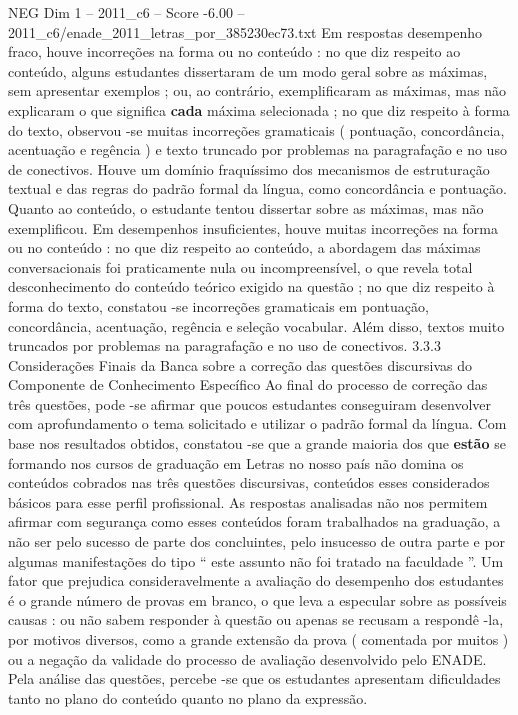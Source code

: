 \begin{textsample}{NEG Dim 1 – 2011\_c6 – Score -6.00 – 2011\_c6/enade\_2011\_letras\_por\_385230ec73.txt}
Em respostas desempenho fraco, houve incorreções na forma ou no conteúdo : no que diz respeito ao conteúdo, alguns estudantes dissertaram de um modo geral sobre as máximas, sem apresentar exemplos ; ou, ao contrário, exemplificaram as máximas, mas não explicaram o que significa \textbf{cada} máxima selecionada ; no que diz respeito à forma do texto, observou -se muitas incorreções gramaticais ( pontuação, concordância, acentuação e regência ) e texto truncado por problemas na paragrafação e no uso de conectivos.
Houve um domínio fraquíssimo dos mecanismos de estruturação textual e das regras do padrão formal da língua, como concordância e pontuação.
Quanto ao conteúdo, o estudante tentou dissertar sobre as máximas, mas não exemplificou.
Em desempenhos insuficientes, houve muitas incorreções na forma ou no conteúdo : no que diz respeito ao conteúdo, a abordagem das máximas conversacionais foi praticamente nula ou incompreensível, o que revela total desconhecimento do conteúdo teórico exigido na questão ; no que diz respeito à forma do texto, constatou -se incorreções gramaticais em pontuação, concordância, acentuação, regência e seleção vocabular.
Além disso, textos muito truncados por problemas na paragrafação e no uso de conectivos. 3.3.3 Considerações Finais da Banca sobre a correção das questões discursivas do Componente de Conhecimento Específico Ao final do processo de correção das três questões, pode -se afirmar que poucos estudantes conseguiram desenvolver com aprofundamento o tema solicitado e utilizar o padrão formal da língua.
Com base nos resultados obtidos, constatou -se que a grande maioria dos que \textbf{estão} se formando nos cursos de graduação em Letras no nosso país não domina os conteúdos cobrados nas três questões discursivas, conteúdos esses considerados básicos para esse perfil profissional.
As respostas analisadas não nos permitem afirmar com segurança como esses conteúdos foram trabalhados na graduação, a não ser pelo sucesso de parte dos concluintes, pelo insucesso de outra parte e por algumas manifestações do tipo “ este assunto não foi tratado na faculdade ”.
Um fator que prejudica consideravelmente a avaliação do desempenho dos estudantes é o grande número de provas em branco, o que leva a especular sobre as possíveis causas : ou não sabem responder à questão ou apenas se recusam a respondê -la, por motivos diversos, como a grande extensão da prova ( comentada por muitos ) ou a negação da validade do processo de avaliação desenvolvido pelo ENADE.
Pela análise das questões, percebe -se que os estudantes apresentam dificuldades tanto no plano do conteúdo quanto no plano da expressão.

\end{textsample}
